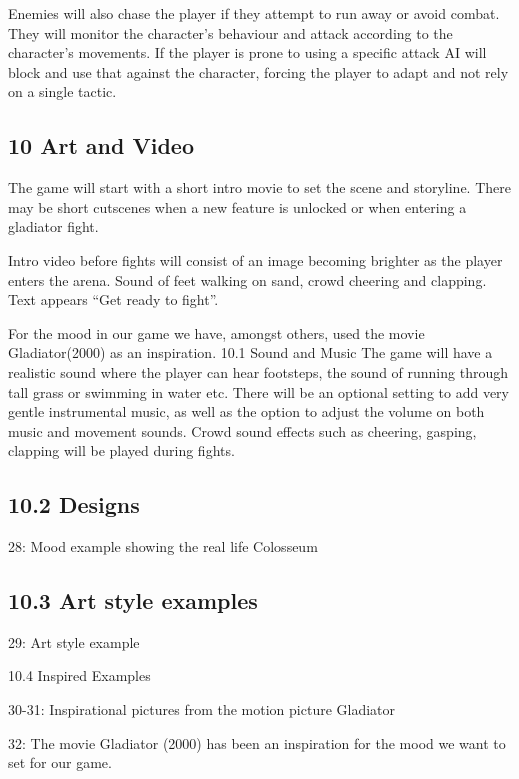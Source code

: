 \documentclass{article}
\begin{document}
\begin{titlepage}
{Enemies will also chase the player if they attempt to run away or avoid combat. They will monitor the character's behaviour and attack according to the character's movements. If the player is prone to using a specific attack AI will block and use that against the character, forcing the player to adapt and not rely on a single tactic.





\subsection{ 10 Art and Video }
The game will start with a short intro movie to set the scene and storyline. There may be short cutscenes when a new feature is unlocked or when entering a gladiator fight.

Intro video before fights will consist of an image becoming brighter as the player enters the arena. Sound of feet walking on sand, crowd cheering and clapping. Text appears “Get ready to fight”.

For the mood in our game we have, amongst others, used the movie Gladiator(2000) as an inspiration.
10.1 Sound and Music
The game will have a realistic sound where the player can hear footsteps, the sound of running through tall grass or swimming in water etc. There will be an optional setting to add very gentle instrumental music, as well as the option to adjust the volume on both music and movement sounds. Crowd sound effects such as cheering, gasping, clapping will be played during fights.

\subsection{ 10.2 Designs }


28: Mood example showing the real life Colosseum

\subsection{ 10.3 Art style examples }

29: Art style example

10.4 Inspired Examples

30-31: Inspirational pictures from the motion picture Gladiator

32: The movie Gladiator (2000) has been an inspiration for the mood we want to set for our game.



}
\end{titlepage}
\end{document}
